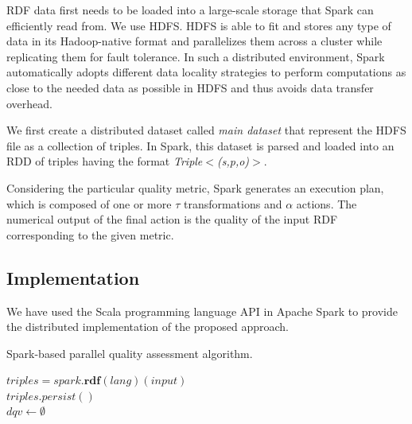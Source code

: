  \gls{RDF} data first needs to be loaded into a large-scale storage that Spark can efficiently read from.
We use \gls{HDFS}.
\gls{HDFS} is able to fit and stores any type of data in its Hadoop-native format and parallelizes them across a cluster while replicating them for fault tolerance.
In such a distributed environment, Spark automatically adopts different data locality strategies to perform computations as close to the needed data as possible in \gls{HDFS} and thus avoids data transfer overhead.
 
 We first create a distributed dataset called \emph{main dataset} that represent the \gls{HDFS} file as a collection of triples.
In Spark, this dataset is parsed and loaded into an \gls{RDD} of triples having the format 
\emph{Triple$<$(s,p,o)$>$}.

 Considering the particular quality metric, Spark generates an execution plan, which is composed of one or more $\tau$ transformations and $\alpha$ actions. 
The numerical output of the final action is the quality of the input \gls{RDF} corresponding to the given metric.

\subsection{Implementation}
\label{subsection:distqualityassessment-implementation}

We have used the Scala programming language API in Apache Spark to provide the distributed implementation of the proposed approach. 

\begin{algorithm}
\caption{Spark-based parallel quality assessment algorithm.}
\label{alg:DistQualityAssessment}
    $\textit{triples} = spark.\textbf{rdf}(lang)(input)$ \label{line:qa-rdf2rdd} \\
    $\textit{triples}.persist()$ \label{line:qa-cache}\\
    $dqv \leftarrow \emptyset$ \\
 \label{line:qa-result}
\end{algorithm}


